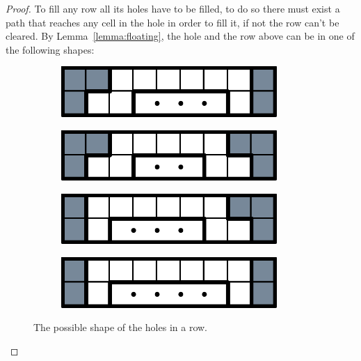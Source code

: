 \begin{proof}
  To fill any row all its holes have to be filled, to do so there must exist a path that reaches any cell in the hole in order to fill it, if not the row can't be cleared. By Lemma~\ref{lemma:floating}, the hole and the row above can be in one of the following shapes:  

\begin{figure}[ht]
  \centering
  \begin{subfigure}[b]{0.24\textwidth}
    \centering
    \includegraphics[width=0.9\textwidth]{pictures/dominoes/row-holes/simple-hole-1.pdf}
    \caption{}
    \label{dom:fill-row:hole-a}
  \end{subfigure}
  \begin{subfigure}[b]{0.24\textwidth}
    \centering
    \includegraphics[width=0.9\textwidth]{pictures/dominoes/row-holes/simple-hole-2.pdf}
    \caption{}
    \label{dom:fill-row:hole-b}
  \end{subfigure}
  \begin{subfigure}[b]{0.24\textwidth}
    \centering
    \includegraphics[width=0.9\textwidth]{pictures/dominoes/row-holes/simple-hole-3.pdf}
    \caption{}
    \label{dom:fill-row:hole-c}
  \end{subfigure}
  \begin{subfigure}[b]{0.24\textwidth}
    \centering
    \includegraphics[width=0.9\textwidth]{pictures/dominoes/row-holes/simple-hole-4.pdf}
    \caption{}
    \label{dom:fill-row:hole-d}
  \end{subfigure}
  \label{dom:fill-row:holes}
  \caption{The possible shape of the holes in a row.}
\end{figure}


\end{proof}
